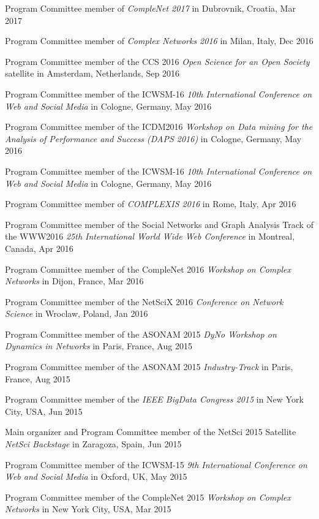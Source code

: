 \documentclass[10pt,a4paper]{article}
\renewenvironment{itemize}{
  \begin{list}{}{
    \setlength{\leftmargin}{1.5em}
    \setlength{\itemsep}{0.25em}
    \setlength{\parskip}{0pt}
    \setlength{\parsep}{0.25em}
  }
}{
  \end{list}
}
\begin{document}
\begin{itemize}
\item{Program Committee member of \emph{CompleNet 2017} in Dubrovnik, Croatia, Mar 2017}
\item{Program Committee member of \emph{Complex Networks 2016} in Milan, Italy, Dec 2016}
\item{Program Committee member of the CCS 2016 \emph{Open Science for an Open Society} satellite in Amsterdam, Netherlands, Sep 2016} 
\item{Program Committee member of the ICWSM-16 \emph{10th International Conference on Web and Social Media} in Cologne, Germany, May 2016} 
\item{Program Committee member of the ICDM2016 \emph{Workshop on Data mining for the Analysis of Performance and Success (DAPS 2016)} in Cologne, Germany, May 2016} 
\item{Program Committee member of the ICWSM-16 \emph{10th International Conference on Web and Social Media} in Cologne, Germany, May 2016} 
\item{Program Committee member of \emph{COMPLEXIS 2016} in Rome, Italy, Apr 2016} 
\item{Program Committee member of the Social Networks and Graph Analysis Track of the WWW2016 \emph{25th International World Wide Web Conference} in Montreal, Canada, Apr 2016} 
\item{Program Committee member of the CompleNet 2016 \emph{Workshop on Complex Networks} in Dijon, France, Mar 2016}
\item{Program Committee member of the NetSciX 2016 \emph{Conference on Network Science} in Wroclaw, Poland, Jan 2016}
\item{Program Committee member of the ASONAM 2015 \emph{DyNo Workshop on Dynamics in Networks} in Paris, France, Aug 2015}
\item{Program Committee member of the ASONAM 2015 \emph{Industry-Track} in Paris, France, Aug 2015}
\item{Program Committee member of the \emph{IEEE BigData Congress 2015} in New York City, USA, Jun 2015}
\item{Main organizer and Program Committee member of the NetSci 2015 Satellite \emph{NetSci Backstage}  in Zaragoza, Spain, Jun 2015}
\item{Program Committee member of the ICWSM-15 \emph{9th International Conference on Web and Social Media} in Oxford, UK, May 2015} 
\item{Program Committee member of the CompleNet 2015 \emph{Workshop on Complex Networks} in New York City, USA, Mar 2015}

\end{itemize}
\end{document}
